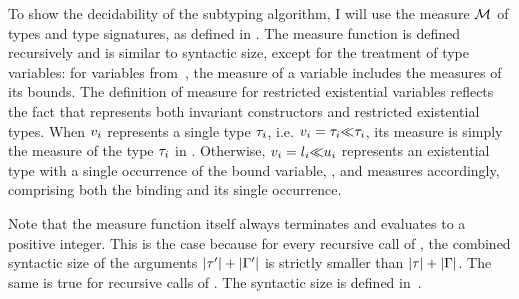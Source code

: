 To show the decidability of the subtyping algorithm,
I will use the measure $\operatorname{\mathcal{M}}$ of types and type signatures,
as defined in .
The measure function is defined recursively and is
similar to syntactic size,
except for the treatment of type variables: for variables from~\AEnv,
the measure of a variable includes the measures of its bounds.
The definition of measure for restricted existential variables \rexvar
reflects the fact that \tyinv{} represents both
invariant constructors and restricted existential types.
When $v_i$ represents a single type $\tau_i$,
i.e. $v_i = \tau_i{\operatorname{\ll}}\tau_i$,
its measure is simply the measure of the type $\tau_i$ in
\tyinv{}.
Otherwise, $v_i = l_i{\operatorname{\ll}}u_i$ represents
an existential type with a single occurrence of the bound variable,
,
and measures accordingly, comprising both the binding and its single occurrence.

Note that the measure function itself always terminates and evaluates to a
positive integer. This is the case because for every recursive call
 of \tymsrdflt{\ty}, 
the combined syntactic size of the arguments $|\tau'| + |\Gamma'|$
is strictly smaller than $|\tau| + |\Gamma|$.
The same is true for recursive calls
 of \tymsrdflt{\tysig}.
The syntactic size is defined in~.

